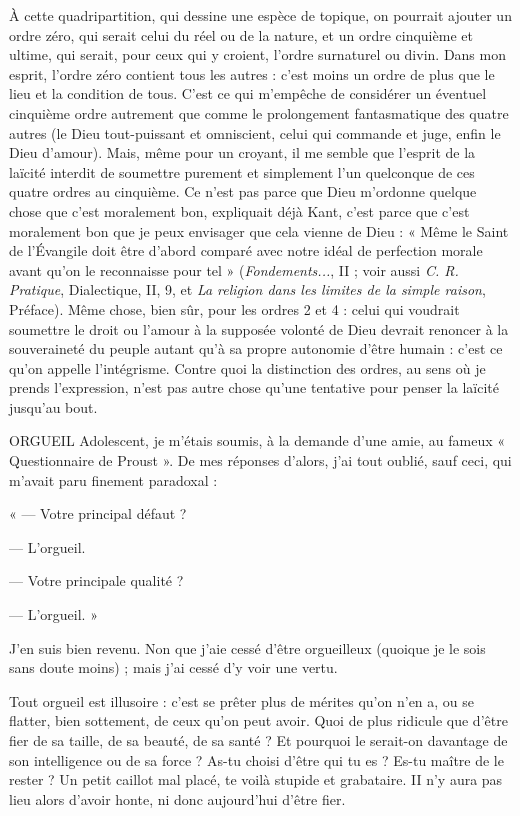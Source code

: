 À cette quadripartition, qui dessine une espèce de topique, on pourrait
ajouter un ordre zéro, qui serait celui du réel ou de la nature, et un ordre cinquième
et ultime, qui serait, pour ceux qui y croient, l’ordre surnaturel ou
divin. Dans mon esprit, l’ordre zéro contient tous les autres : c’est moins un
ordre de plus que le lieu et la condition de tous. C’est ce qui m’empêche de
considérer un éventuel cinquième ordre autrement que comme le prolongement
fantasmatique des quatre autres (le Dieu tout-puissant et omniscient,
celui qui commande et juge, enfin le Dieu d’amour). Mais, même pour un
croyant, il me semble que l'esprit de la laïcité interdit de soumettre purement
et simplement l’un quelconque de ces quatre ordres au cinquième. Ce n’est pas
parce que Dieu m’ordonne quelque chose que c’est moralement bon, expliquait
déjà Kant, c’est parce que c’est moralement bon que je peux envisager
que cela vienne de Dieu : « Même le Saint de l'Évangile doit être d’abord comparé
avec notre idéal de perfection morale avant qu’on le reconnaisse pour tel »
({\it Fondements...}, II ; voir aussi {\it C. R. Pratique}, Dialectique, II, 9, et {\it La religion
dans les limites de la simple raison}, Préface). Même chose, bien sûr, pour les
ordres 2 et 4 : celui qui voudrait soumettre le droit ou l’amour à la supposée
volonté de Dieu devrait renoncer à la souveraineté du peuple autant qu’à sa
propre autonomie d’être humain : c’est ce qu’on appelle l’intégrisme. Contre
quoi la distinction des ordres, au sens où je prends l’expression, n’est pas autre
chose qu’une tentative pour penser la laïcité jusqu’au bout.

ORGUEIL Adolescent, je m'étais soumis, à la demande d’une amie, au
fameux « Questionnaire de Proust ». De mes réponses d’alors,
j'ai tout oublié, sauf ceci, qui m’avait paru finement paradoxal :

« — Votre principal défaut ?

— L’orgueil.

— Votre principale qualité ?

— L’orgueil. »

J'en suis bien revenu. Non que j'aie cessé d’être orgueilleux (quoique je le
sois sans doute moins) ; mais j’ai cessé d’y voir une vertu.

Tout orgueil est illusoire : c’est se prêter plus de mérites qu’on n’en a, ou se
flatter, bien sottement, de ceux qu’on peut avoir. Quoi de plus ridicule que
d’être fier de sa taille, de sa beauté, de sa santé ? Et pourquoi le serait-on davantage
de son intelligence ou de sa force ? As-tu choisi d’être qui tu es ? Es-tu
maître de le rester ? Un petit caillot mal placé, te voilà stupide et grabataire. II
n’y aura pas lieu alors d’avoir honte, ni donc aujourd’hui d’être fier.

